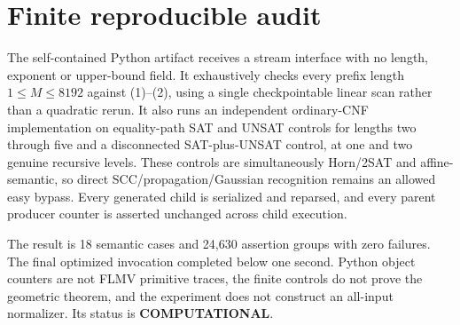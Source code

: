 \documentclass[11pt]{article}
\begin{document}
\section{Finite reproducible audit}
The self-contained Python artifact receives a stream interface with no length,
exponent or upper-bound field.  It exhaustively checks every prefix length
$1\le M\le8192$ against (1)--(2), using a single checkpointable linear scan
rather than a quadratic rerun.  It also runs an independent ordinary-CNF
implementation on equality-path SAT and UNSAT controls for lengths two through
five and a disconnected SAT-plus-UNSAT control, at one and two genuine recursive
levels.  These controls are simultaneously Horn/2SAT and affine-semantic, so
direct SCC/propagation/Gaussian recognition remains an allowed easy bypass.
Every generated child is serialized and reparsed, and every parent producer
counter is asserted unchanged across child execution.

The result is 18 semantic cases and 24,630 assertion groups with zero failures.
The final optimized invocation completed below one second.  Python object
counters are not FLMV primitive traces, the finite controls do not prove the
geometric theorem, and the experiment does not construct an all-input
normalizer.  Its status is \textbf{COMPUTATIONAL}.
\end{document}
